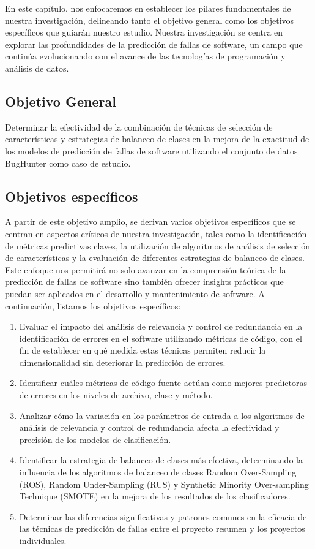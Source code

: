 En este capítulo, nos enfocaremos en establecer los pilares fundamentales de nuestra investigación, delineando tanto el objetivo general como los objetivos específicos que guiarán nuestro estudio. Nuestra investigación se centra en explorar las profundidades de la predicción de fallas de software, un campo que continúa evolucionando con el avance de las tecnologías de programación y análisis de datos.
\subsection*{Objetivo General}

Determinar la efectividad de la combinación de técnicas de selección de características y estrategias de balanceo de clases en la mejora de la exactitud de los modelos de predicción de fallas de software utilizando el conjunto de datos BugHunter como caso de estudio.

\subsection*{Objetivos específicos}

A partir de este objetivo amplio, se derivan varios objetivos específicos que se centran en aspectos críticos de nuestra investigación, tales como la identificación de métricas predictivas claves, la utilización de algoritmos de análisis de selección de características y la evaluación de diferentes estrategias de balanceo de clases. Este enfoque nos permitirá no solo avanzar en la comprensión teórica de la predicción de fallas de software sino también ofrecer insights prácticos que puedan ser aplicados en el desarrollo y mantenimiento de software. A continuación, listamos los objetivos específicos:
\begin{enumerate}
    \item Evaluar el impacto del análisis de relevancia y control de redundancia en la identificación de errores en el software utilizando métricas de código, con el fin de establecer en qué medida estas técnicas permiten reducir la dimensionalidad sin deteriorar la predicción de errores.

    \item Identificar cuáles métricas de código fuente actúan como mejores predictoras de errores en los niveles de archivo, clase y método.

    \item Analizar cómo la variación en los parámetros de entrada a los algoritmos de análisis de relevancia y control de redundancia afecta la efectividad y precisión de los modelos de clasificación.
    
    \item Identificar la estrategia de balanceo de clases más efectiva, determinando la influencia de los algoritmos de balanceo de clases Random Over-Sampling (ROS), Random Under-Sampling (RUS) y Synthetic Minority Over-sampling Technique (SMOTE) en la mejora de los resultados de  los clasificadores.
    \item Determinar las diferencias significativas y patrones comunes en la eficacia de las técnicas de predicción de fallas entre el proyecto resumen y los proyectos individuales.
\end{enumerate}

